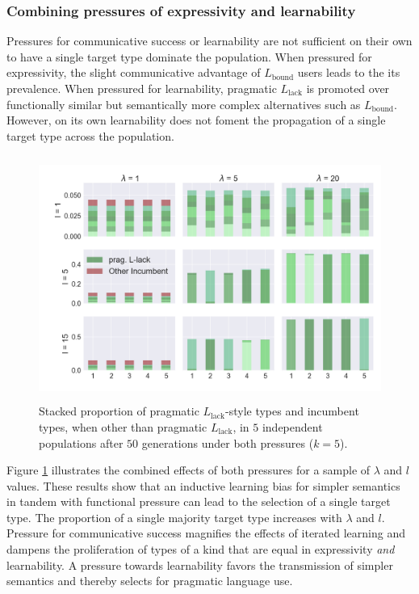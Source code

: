 \documentclass[a4paper, 11pt]{article}
\theoremstyle{Satz}
\newcommand{\mylang}[1]{\ensuremath{L_{\text{#1}}}\xspace} %
\newcommand{\Lbound}{\mylang{bound}}
\newcommand{\Llack}{\mylang{lack}}
\begin{document}
\subsubsection{Combining pressures of expressivity and learnability}

Pressures for communicative success or learnability are not sufficient on their own to have a
single target type dominate the population. When pressured for expressivity, the slight
communicative advantage of $\Lbound$ users leads to the its prevalence. When pressured for
learnability, pragmatic $\Llack$ is promoted over functionally similar but semantically more
complex alternatives such as $\Lbound$. However, on its own learnability does not foment the
propagation of a single target type across the population.

\begin{figure}[t]
\centering
\includegraphics[width=1\textwidth,height=8cm,keepaspectratio]{./plots/fig3-r+m}
\caption{Stacked proportion of pragmatic $\Llack$-style types and incumbent types, when other than pragmatic $\Llack$, in $5$ independent populations after $50$ generations under both pressures ($k = 5$).}
\label{fig:rmd}
\end{figure}

Figure \ref{fig:rmd} illustrates the combined effects of both pressures for a sample of
$\lambda$ and $l$ values. These results show that an inductive learning bias for simpler
semantics in tandem with functional pressure can lead to the selection of a single target
type. The proportion of a single majority target type increases with $\lambda$ and
$l$. Pressure for communicative success magnifies the effects of iterated learning and dampens
the proliferation of types of a kind that are equal in expressivity {\em and} learnability. A
pressure towards learnability favors the transmission of simpler semantics and thereby selects
for pragmatic language use.
\end{document}
